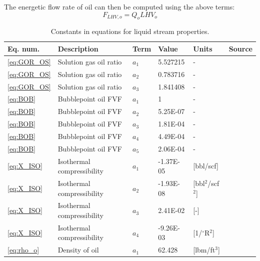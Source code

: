 \documentclass[11pt]{report}
\begin{document}
The energetic flow rate of oil can then be computed using the above terms:
\begin{equation}
F_{LHV,o} = Q_o  LHV_o
\end{equation}




\begin{table}
\begin{scriptsize}
\caption{Constants in equations for liquid stream properties.}
\label{tab:ConstantsLiquidFlowSheet}
\begin{tabularx}{1\columnwidth}{p{}p{}p{}p{}p{}p{}}
\toprule
Eq. num. 			& Description	 			& Term		& Value  		& Units		& Source \\
\midrule
\ref{eq:GOR_OS}	& Solution gas oil ratio		& $a_1$		& 5.527215	& -			& \cite{Alshammasi1999} \\
\ref{eq:GOR_OS}	& Solution gas oil ratio		& $a_2$		& 0.783716	& -			& \cite{Alshammasi1999} \\
\ref{eq:GOR_OS}	& Solution gas oil ratio		& $a_3$		& 1.841408	& -			& \cite{Alshammasi1999} \\
\midrule
\ref{eq:BOB}		& Bubblepoint oil FVF		& $a_1$		& 1			& -			& \cite{Alshammasi1999} \\
\ref{eq:BOB}		& Bubblepoint oil FVF		& $a_2$		& 5.25E-07	& -			& \cite{Alshammasi1999} \\
\ref{eq:BOB}		& Bubblepoint oil FVF		& $a_3$		& 1.81E-04	& -			& \cite{Alshammasi1999} \\
\ref{eq:BOB}		& Bubblepoint oil FVF		& $a_4$		& 4.49E-04	& -			& \cite{Alshammasi1999} \\
\ref{eq:BOB}		& Bubblepoint oil FVF		& $a_5$		& 2.06E-04	& -			& \cite{Alshammasi1999} \\
\midrule
\ref{eq:X_ISO}		& Isothermal compressibility	& $a_1$		& -1.37E-05	& [bbl/scf]			& \cite{Almahoun1992} \\
\ref{eq:X_ISO}		& Isothermal compressibility	& $a_2$		& -1.93E-08	& [bbl$^2$/scf$^2$]			& \cite{Almahoun1992} \\
\ref{eq:X_ISO}		& Isothermal compressibility	& $a_3$		& 2.41E-02	& [-]			& \cite{Almahoun1992} \\
\ref{eq:X_ISO}		& Isothermal compressibility	& $a_4$		& -9.26E-03	& [1/$^\circ$R$^2$]			& \cite{Almahoun1992} \\
\midrule
\ref{eq:rho_o}		& Density of oil				& $a_1$		& 62.428		& [lbm/ft$^3$]			& \cite{Fanchi2007} \\

\end{tabularx}
\end{scriptsize}
\end{table}
\end{document}
